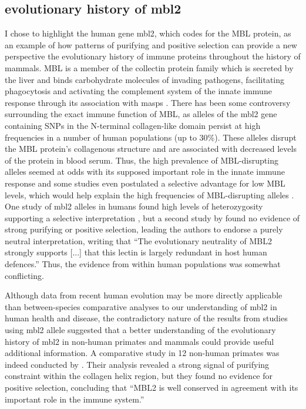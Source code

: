 \subsection{\Sw evolutionary history of \ac{mbl2}}

I chose to highlight the human gene \ac{mbl2}, which codes for the MBL
protein, as an example of how \sw patterns of purifying and positive
selection can provide a new perspective the evolutionary history of
immune proteins throughout the history of mammals. MBL is a member of
the collectin protein family which is secreted by the liver and binds
carbohydrate molecules of invading pathogens, facilitating
phagocytosis and activating the complement system of the innate immune
response through its association with \acp{masp}
\citep{Seyfarth2005}. There has been some controversy surrounding the
exact immune function of MBL, as alleles of the \ac{mbl2} gene
containing SNPs in the N-terminal collagen-like domain persist at high
frequencies in a number of human populations (up to 30\%). These
alleles disrupt the MBL protein's collagenous structure and are
associated with decreased levels of the protein in blood serum. Thus,
the high prevalence of MBL-disrupting alleles seemed at odds with its
supposed important role in the innate immune response
\citep{Seyfarth2005} and some studies even postulated a selective
advantage for low MBL levels, which would help explain the high
frequencies of MBL-disrupting alleles \citep{Garred2006}. One study of
\ac{mbl2} alleles in humans found high levels of heterozygosity
supporting a selective interpretation \citep{Bernig2004}, but a second
study by \citet{Verdu2006} found no evidence of strong purifying or
positive selection, leading the authors to endorse a purely neutral
interpretation, writing that ``The evolutionary neutrality of MBL2
strongly supports [...]  that this lectin is largely redundant in host
human defences.'' Thus, the evidence from within human populations was
somewhat conflicting.

Although data from recent human evolution may be more directly
applicable than between-species comparative analyses to our
understanding of \ac{mbl2} in human health and disease, the
contradictory nature of the results from studies using \ac{mbl2}
allele suggested that a better understanding of the evolutionary
history of \ac{mbl2} in non-human primates and mammals could provide
useful additional information. A comparative study in 12 non-human
primates was indeed conducted by \citet{Falzacappa2004}. Their
analysis revealed a strong signal of purifying constraint within the
collagen helix region, but they found no evidence for positive
selection, concluding that ``MBL2 is well conserved in agreement with
its important role in the immune system.''

